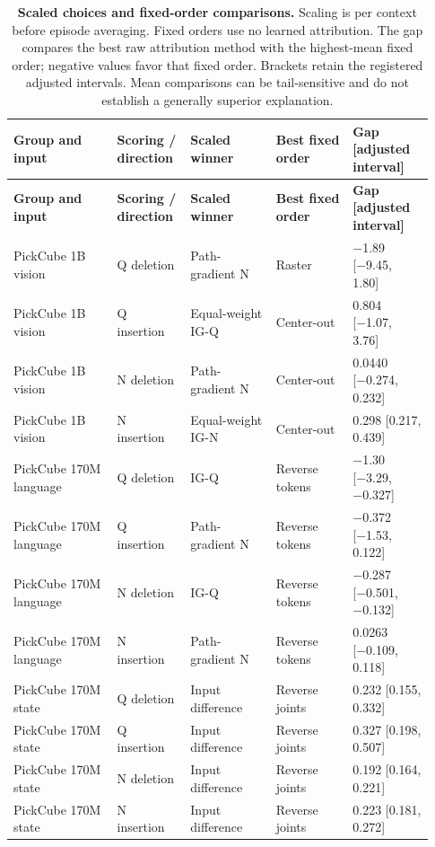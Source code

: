 \setlength{\tabcolsep}{2pt}
\begin{longtable}{p{0.230\linewidth} p{0.160\linewidth} p{0.190\linewidth} p{0.170\linewidth} p{0.180\linewidth}}
\caption{\textbf{Scaled choices and fixed-order comparisons.} Scaling is per context before episode averaging. Fixed orders use no learned attribution. The gap compares the best raw attribution method with the highest-mean fixed order; negative values favor that fixed order. Brackets retain the registered adjusted intervals. Mean comparisons can be tail-sensitive and do not establish a generally superior explanation.}\label{tab:r1-calibration}\\
\toprule
\textbf{Group and input} & \textbf{Scoring / direction} & \textbf{Scaled winner} & \textbf{Best fixed order} & \textbf{Gap [adjusted interval]} \\
\midrule\endfirsthead
\toprule
\textbf{Group and input} & \textbf{Scoring / direction} & \textbf{Scaled winner} & \textbf{Best fixed order} & \textbf{Gap [adjusted interval]} \\
\midrule\endhead
\bottomrule\endfoot
PickCube 1B vision & Q deletion & Path-gradient N & Raster & −1.89 [−9.45, 1.80] \\
PickCube 1B vision & Q insertion & Equal-weight IG-Q & Center-out & 0.804 [−1.07, 3.76] \\
PickCube 1B vision & N deletion & Path-gradient N & Center-out & 0.0440 [−0.274, 0.232] \\
PickCube 1B vision & N insertion & Equal-weight IG-N & Center-out & 0.298 [0.217, 0.439] \\
PickCube 170M language & Q deletion & IG-Q & Reverse tokens & −1.30 [−3.29, −0.327] \\
PickCube 170M language & Q insertion & Path-gradient N & Reverse tokens & −0.372 [−1.53, 0.122] \\
PickCube 170M language & N deletion & IG-Q & Reverse tokens & −0.287 [−0.501, −0.132] \\
PickCube 170M language & N insertion & Path-gradient N & Reverse tokens & 0.0263 [−0.109, 0.118] \\
PickCube 170M state & Q deletion & Input difference & Reverse joints & 0.232 [0.155, 0.332] \\
PickCube 170M state & Q insertion & Input difference & Reverse joints & 0.327 [0.198, 0.507] \\
PickCube 170M state & N deletion & Input difference & Reverse joints & 0.192 [0.164, 0.221] \\
PickCube 170M state & N insertion & Input difference & Reverse joints & 0.223 [0.181, 0.272] \\

\end{longtable}
